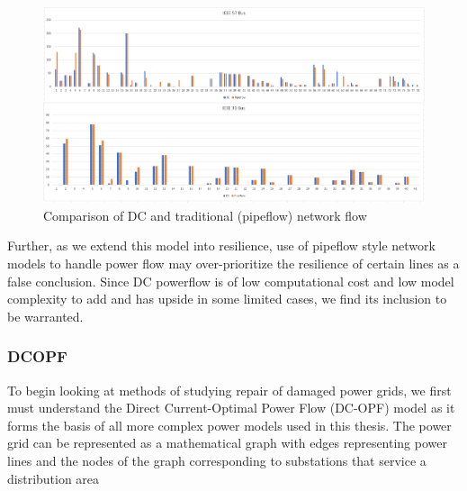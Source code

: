 \documentclass{article}
\begin{document}
	\begin{figure}
		\centering
		\includegraphics[width=\linewidth]{DCvsPipeflow.PNG}
		\caption{Comparison of DC and traditional (pipeflow) network flow}
	\end{figure}
	
	Further, as we extend this model into resilience, use of pipeflow style network models to handle power flow may over-prioritize the resilience of certain lines as a false conclusion. Since DC powerflow is of low computational cost and low model complexity to add and has upside in some limited cases, we find its inclusion to be warranted.
	\subsubsection{DCOPF}
		To begin looking at methods of studying repair of damaged power grids, we first must understand the Direct Current-Optimal Power Flow (DC-OPF) model as it forms the basis of all more complex power models used in this thesis. The power grid can be represented as a mathematical graph with edges representing power lines and the nodes of the graph corresponding to substations that service a distribution area
		
\end{document}
